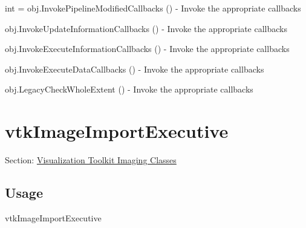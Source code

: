 \begin{DoxyItemize}
\item {\ttfamily int = obj.\-Invoke\-Pipeline\-Modified\-Callbacks ()} -\/ Invoke the appropriate callbacks  
\item {\ttfamily obj.\-Invoke\-Update\-Information\-Callbacks ()} -\/ Invoke the appropriate callbacks  
\item {\ttfamily obj.\-Invoke\-Execute\-Information\-Callbacks ()} -\/ Invoke the appropriate callbacks  
\item {\ttfamily obj.\-Invoke\-Execute\-Data\-Callbacks ()} -\/ Invoke the appropriate callbacks  
\item {\ttfamily obj.\-Legacy\-Check\-Whole\-Extent ()} -\/ Invoke the appropriate callbacks  
\end{DoxyItemize}\hypertarget{vtkimaging_vtkimageimportexecutive}{}\section{vtk\-Image\-Import\-Executive}\label{vtkimaging_vtkimageimportexecutive}
Section\-: \hyperlink{sec_vtkimaging}{Visualization Toolkit Imaging Classes} \hypertarget{vtkwidgets_vtkxyplotwidget_Usage}{}\subsection{Usage}\label{vtkwidgets_vtkxyplotwidget_Usage}
vtk\-Image\-Import\-Executive

